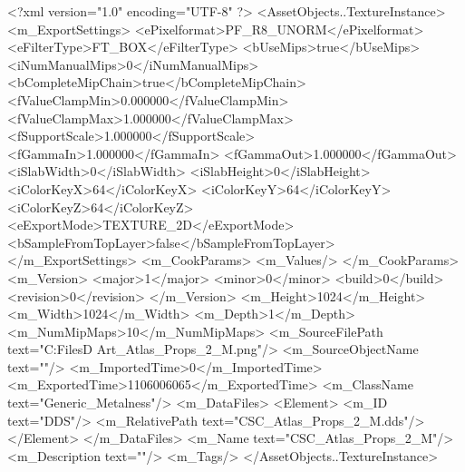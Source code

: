 <?xml version="1.0" encoding="UTF-8" ?>
<AssetObjects..TextureInstance>
	<m_ExportSettings>
		<ePixelformat>PF_R8_UNORM</ePixelformat>
		<eFilterType>FT_BOX</eFilterType>
		<bUseMips>true</bUseMips>
		<iNumManualMips>0</iNumManualMips>
		<bCompleteMipChain>true</bCompleteMipChain>
		<fValueClampMin>0.000000</fValueClampMin>
		<fValueClampMax>1.000000</fValueClampMax>
		<fSupportScale>1.000000</fSupportScale>
		<fGammaIn>1.000000</fGammaIn>
		<fGammaOut>1.000000</fGammaOut>
		<iSlabWidth>0</iSlabWidth>
		<iSlabHeight>0</iSlabHeight>
		<iColorKeyX>64</iColorKeyX>
		<iColorKeyY>64</iColorKeyY>
		<iColorKeyZ>64</iColorKeyZ>
		<eExportMode>TEXTURE_2D</eExportMode>
		<bSampleFromTopLayer>false</bSampleFromTopLayer>
	</m_ExportSettings>
	<m_CookParams>
		<m_Values/>
	</m_CookParams>
	<m_Version>
		<major>1</major>
		<minor>0</minor>
		<build>0</build>
		<revision>0</revision>
	</m_Version>
	<m_Height>1024</m_Height>
	<m_Width>1024</m_Width>
	<m_Depth>1</m_Depth>
	<m_NumMipMaps>10</m_NumMipMaps>
	<m_SourceFilePath text="C:\Users\Shadow\Desktop\Working Files\3D Art\Textures\CSC_Atlas_Props_2_M.png"/>
	<m_SourceObjectName text=""/>
	<m_ImportedTime>0</m_ImportedTime>
	<m_ExportedTime>1106006065</m_ExportedTime>
	<m_ClassName text="Generic_Metalness"/>
	<m_DataFiles>
		<Element>
			<m_ID text="DDS"/>
			<m_RelativePath text="CSC_Atlas_Props_2_M.dds"/>
		</Element>
	</m_DataFiles>
	<m_Name text="CSC_Atlas_Props_2_M"/>
	<m_Description text=""/>
	<m_Tags/>
</AssetObjects..TextureInstance>

